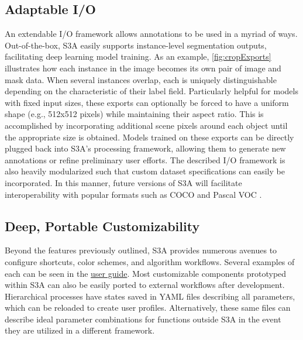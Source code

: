 \subsection{Adaptable I/O}
An extendable I/O framework allows annotations to be used in a myriad of ways.
Out-of-the-box, S3A easily supports instance-level segmentation outputs, facilitating deep learning model training.
As an example, \autoref{fig:cropExports} illustrates how each instance in the image becomes its own pair of image and mask data.
When several instances overlap, each is uniquely distinguishable depending on the characteristic of their label field.
Particularly helpful for models with fixed input sizes, these exports can optionally be forced to have a uniform shape (e.g., 512x512 pixels) while maintaining their aspect ratio.
This is accomplished by incorporating additional scene pixels around each object until the appropriate size is obtained.
Models trained on these exports can be directly plugged back into S3A's processing framework, allowing them to generate new annotations or refine preliminary user efforts.
The described I/O framework is also heavily modularized such that custom dataset specifications can easily be incorporated.
In this manner, future versions of S3A will facilitate interoperability with popular formats such as COCO and Pascal VOC \cite{lin_microsoft_2014,everingham_pascal_2010}.

\makeCropExportsFig

\subsection{Deep, Portable Customizability}
Beyond the features previously outlined, S3A provides numerous avenues to configure shortcuts, color schemes, and algorithm workflows.
Several examples of each can be seen in the \href{https://gitlab.com/s3a/s3a/-/wikis/docs/user's-guide}{user guide}.
Most customizable components prototyped within S3A can also be easily ported to external workflows after development.
Hierarchical processes have states saved in YAML files describing all parameters, which can be reloaded to create user profiles.
Alternatively, these same files can describe ideal parameter combinations for functions outside S3A in the event they are utilized in a different framework.